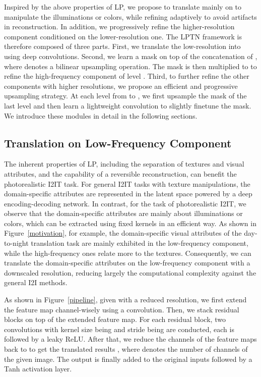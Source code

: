 \documentclass[10pt,twocolumn,letterpaper]{article}
\begin{document}
	Inspired by the above properties of LP, we propose to translate mainly on  to manipulate the illuminations or colors, while refining  adaptively to avoid artifacts in reconstruction. In addition, we progressively refine the higher-resolution component conditioned on the lower-resolution one. The LPTN framework is therefore composed of three parts. First, we translate the low-resolution  into  using deep convolutions. Second, we learn a mask on top of the concatenation of , where  denotes a bilinear upsampling operation. The mask is then multiplied to  to refine the high-frequency component of level . Third, to further refine the other components with higher resolutions, we propose an efficient and progressive upsampling strategy. At each level from  to , we first upsample the mask of the last level and then learn a lightweight convolution to slightly finetune the mask. We introduce these modules in detail in the following sections.
	
	\subsection{Translation on Low-Frequency Component}
	\label{low_frequency}
	
	The inherent properties of LP, including the separation of textures and visual attributes, and the capability of a reversible reconstruction, can benefit the photorealistic I2IT task. For general I2IT tasks with texture manipulations, the domain-specific attributes are represented in the latent space powered by a deep encoding-decoding network. In contrast, for the task of photorealistic I2IT, we observe that the domain-specific attributes are mainly about illuminations or colors, which can be extracted using fixed kernels in an efficient way. As shown in Figure~\ref{motivation}, for example, the domain-specific visual attributes of the day-to-night translation task are mainly exhibited in the low-frequency component, while the high-frequency ones relate more to the textures. Consequently, we can translate the domain-specific attributes on the low-frequency component with a downscaled resolution, reducing largely the computational complexity against the general I2I methods.
	
	As shown in Figure~\ref{pipeline}, given  with a reduced resolution, we first extend the feature map channel-wisely using a  convolution. Then, we stack  residual blocks on top of the extended feature map. For each residual block, two convolutions with kernel size being  and stride being  are conducted, each is followed by a leaky ReLU. After that, we reduce the channels of the feature maps back to  to get the translated results , where  denotes the number of channels of the given image. The output is finally added to the original inputs followed by a Tanh activation layer.
	
\end{document}
